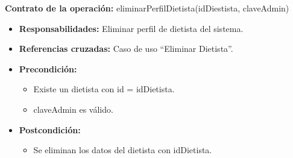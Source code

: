 \textbf{Contrato de la operación:} eliminarPerfilDietista(idDiestista, claveAdmin)
\begin{itemize}
\item \textbf{Responsabilidades:} Eliminar perfil de dietista del sistema.
\item \textbf{Referencias cruzadas:} Caso de uso ``Eliminar Dietista''.
\item \textbf{Precondición:}
\begin{itemize}
\item Existe un dietista con id = idDietista.
\item claveAdmin es válido.
\end{itemize}
\item \textbf{Postcondición:}
\begin{itemize}
\item Se eliminan los datos del dietista con idDietista.
\end{itemize}
\end{itemize}


\newpage

